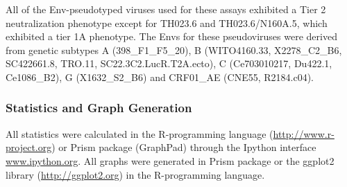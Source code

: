 All of the Env-pseudotyped viruses used for these assays exhibited a Tier 2 neutralization phenotype except for TH023.6 and TH023.6/N160A.5, which exhibited a tier 1A phenotype. The Envs for these pseudoviruses were derived from genetic subtypes A (398\_F1\_F5\_20), B (WITO4160.33, X2278\_C2\_B6, SC422661.8, TRO.11, SC22.3C2.LucR.T2A.ecto), C (Ce703010217, Du422.1, Ce1086\_B2), G (X1632\_S2\_B6) and CRF01\_AE (CNE55, R2184.c04).

\subsubsection{Statistics and Graph Generation}
All statistics were calculated in the R-programming language (\url{http://www.r-project.org}) or Prism package (GraphPad) through the Ipython interface \url{www.ipython.org}. All graphs were generated in Prism package or the ggplot2 library (\url{http://ggplot2.org}) in the R-programming language.
\clearpage